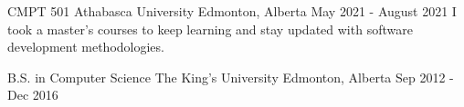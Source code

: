 
\begin{cventries}
  \cventry
    {CMPT 501} %
    {Athabasca University} %
    {Edmonton, Alberta} %
    {May 2021 - August 2021} %
    {I took a master's courses to keep learning and stay updated with software development methodologies.}

  \cventry
    {B.S. in Computer Science} %
    {The King's University} %
    {Edmonton, Alberta} %
    {Sep 2012 - Dec 2016} %
    {}
\end{cventries}